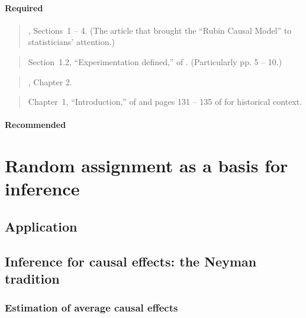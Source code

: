 \documentclass[12pt]{article}
\begin{document}
\paragraph*{Required}

\begin{verse}, Sections~1 -- 4. (The article that brought the ``Rubin Causal Model'' to  statisticians' attention.)\end{verse}

\begin{verse} Section~1.2, ``Experimentation defined,''  of
.  (Particularly pp. 5 -- 10.) \end{verse}

\begin{verse} , Chapter 2. \end{verse}

\begin{verse} Chapter~1, ``Introduction,'' of  and pages 131 -- 135 of  for historical context. \end{verse}

\paragraph*{Recommended}

\begin{verse}  \end{verse}

\section{Random assignment as a basis for inference}

\subsection*{Application}

\begin{verse}  \end{verse}

\subsection{Inference for causal effects: the Neyman tradition}

\subsubsection{Estimation of average causal effects}
\end{document}
